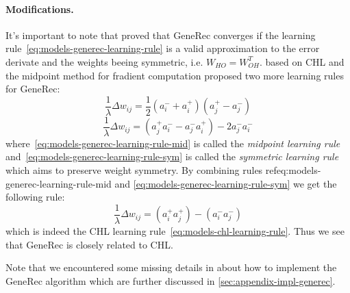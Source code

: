 \paragraph{Modifications.}
It's important to note that \citet{o1996bio} proved that GeneRec converges if the learning rule~\ref{eq:models-generec-learning-rule} is a valid approximation to the error derivate and the weights beeing symmetric, i.e. $W_{HO} = W^{T}_{OH}$. \citet{o1996bio} based on CHL and the midpoint method for fradient computation \citep{press1990numerical} proposed two more learning rules for GeneRec: 
\begin{equation}
  \label{eq:models-generec-learning-rule-mid}
  \frac{1}{\lambda} \Delta w_{ij} =  \frac{1}{2}(a^{-}_i + a^{+}_i)(a^{+}_j - a^{-}_j)
\end{equation}
\begin{equation}
  \label{eq:models-generec-learning-rule-sym}
  \frac{1}{\lambda} \Delta w_{ij} =  (a^{+}_j a^{-}_i - a^{-}_j a^{+}_i) - 2a^{-}_j a^{-}_i
\end{equation}
where~\ref{eq:models-generec-learning-rule-mid} is called the \emph{midpoint learning rule} and~\ref{eq:models-generec-learning-rule-sym} is called the \emph{symmetric learning rule} which aims to preserve weight symmetry. By combining rules ref{eq:models-generec-learning-rule-mid} and \ref{eq:models-generec-learning-rule-sym} we get the following rule: 
\begin{equation}
  \label{eq:models-generec-learning-rule-chl}
  \frac{1}{\lambda} \Delta w_{ij} =  (a^{+}_i a^{+}_j) - (a^{-}_i a^{-}_j)
\end{equation}
which is indeed the CHL learning rule~\ref{eq:models-chl-learning-rule}. Thus we see that GeneRec is closely related to CHL. 

Note that we encountered some missing details in \citet{o1996bio} about how to implement the GeneRec algorithm which are further discussed in \ref{sec:appendix-impl-generec}.
